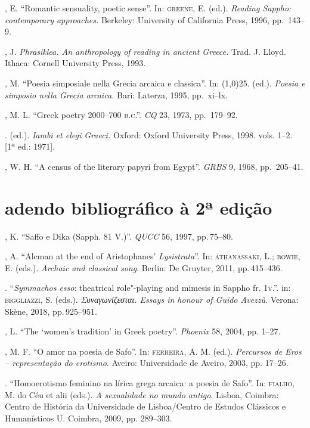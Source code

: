 \begin{bibliohedra}
, E. “Romantic sensuality, poetic sense”. In: \textsc{greene}, E.
(ed.). \textit{Reading Sappho: contemporary approaches.} Berkeley: University
of California Press, 1996, pp.~143--9.

, J. \textit{Phrasiklea. An anthropology of reading in ancient
Greece.} Trad. J. Lloyd. Ithaca: Cornell University Press, 1993.

, M. “Poesia simposiale nella Grecia arcaica e classica”. In:
\line(1,0){25}. (ed.). \textit{Poesia e simposio nella Grecia arcaica.}
Bari: Laterza, 1995, pp.~xi--lx.

, M. L. “Greek poetry 2000--700 \textsc{b.c.”.} \textit{CQ} 23, 1973,
pp.~179--92.

\titidem. (ed.). \textit{Iambi et elegi Graeci.} Oxford: Oxford University
Press, 1998. vols. 1--2. [1ª ed.: 1971].

, W. H. “A census of the literary papyri from Egypt”.
\textit{GRBS} 9, 1968, pp.~205--41.



\section*{adendo bibliográfico à 2ª edição}

, K. “Saffo e Dika (Sapph. 81 V.)”. \textit{QUCC} 56, 1997, pp.\,75--80.

, A. “Alcman at the end of Aristophanes' \textit{Lysistrata}”. In: \textsc{athanassaki}, L.; \textsc{bowie}, E. (eds.). \textit{Archaic and classical song}. Berlin: De Gruyter, 2011, pp.\,415--436.

\titidem.  “\textit{Symmachos esso}: theatrical role"-playing and mimesis in Sappho fr. 1\textsc{v}.”. in: \textsc{biggliazzi}, S. (eds.). \textit{Συναγωνίζεσται. Essays in honour of Guido Avezzù}. Verona: Skène, 2018, pp.\,925--951.


, L. “The ‘women’s tradition’ in Greek poetry”. \textit{Phoenix} 58, 2004, pp. 1--27.

, M. F. “O amor na poesia de Safo”. In: \textsc{ferreira}, A. M. (ed.). \textit{Percursos de Eros -- representação do erotismo}. Aveiro: Universidade de Aveiro, 2003, pp. 17--26.

\titidem. “Homoerotismo feminino na lírica grega arcaica: a poesia de Safo”. In: \textsc{fialho}, M. do Céu et alii (eds.). \textit{A sexualidade no mundo antigo}. Lisboa, Coimbra: Centro de História da Universidade de Lisboa/Centro de Estudos Clássicos e Humanísticos U. Coimbra, 2009, pp. 289--303. 


\end{bibliohedra}
